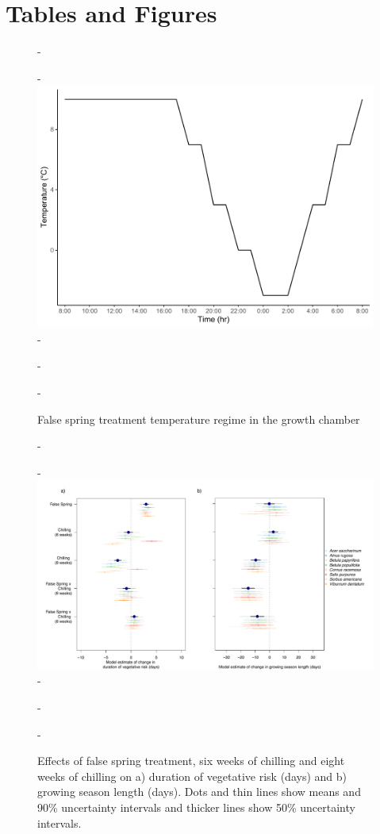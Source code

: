 \documentclass{article}\usepackage[]{graphicx}\usepackage[]{color}
\begin{document}


\section*{Tables and Figures}

{\begin{figure} [H]
  -\begin{center}
  -\includegraphics[width=12cm]{..//analyses/figures/growthchamber.pdf}
  -\caption{False spring treatment temperature regime in the growth chamber}\label{fig:gccond}
  -\end{center}
  -\end{figure}}
  
  {\begin{figure} [H]
  -\begin{center}
  -\includegraphics[width=18cm]{..//analyses/figures/mu_phen.pdf} 
  -\caption{Effects of false spring treatment, six weeks of chilling and eight weeks of chilling on a) duration of vegetative risk (days) and b) growing season length (days). Dots and thin lines show means and 90\% uncertainty intervals and thicker lines show 50\% uncertainty intervals.}\label{fig:muphen} %
  -\end{center}
  -\end{figure}}
  
\end{document}
